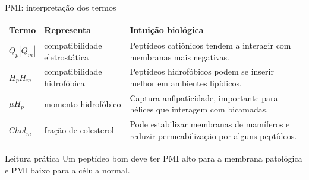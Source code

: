 \documentclass[aspectratio=169,10pt]{beamer}
\begin{document}
\begin{frame}{PMI: interpretação dos termos}
\small
\begin{center}
\begin{tabular}{p{2.4cm}p{4.0cm}p{5.7cm}}
\toprule
\textbf{Termo} & \textbf{Representa} & \textbf{Intuição biológica} \\
\midrule
$Q_p|Q_m|$ & compatibilidade eletrostática & Peptídeos catiônicos tendem a interagir com membranas mais negativas. \\
$H_pH_m$ & compatibilidade hidrofóbica & Peptídeos hidrofóbicos podem se inserir melhor em ambientes lipídicos. \\
$\mu H_p$ & momento hidrofóbico & Captura anfipaticidade, importante para hélices que interagem com bicamadas. \\
$Chol_m$ & fração de colesterol & Pode estabilizar membranas de mamíferos e reduzir permeabilização por alguns peptídeos. \\
\bottomrule
\end{tabular}
\end{center}

\vspace{0.15cm}
\begin{block}{Leitura prática}
Um peptídeo bom deve ter PMI alto para a membrana patológica e PMI baixo para a célula normal.
\end{block}
\end{frame}
\end{document}
